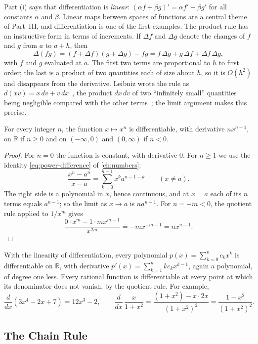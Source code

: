 Part (i) says that differentiation is \emph{linear}: $(\alpha f+\beta g)'=\alpha f'+\beta g'$ for all constants $\alpha$ and $\beta$. Linear maps between spaces of functions are a central theme of Part~III, and differentiation is one of the first examples. The product rule has an instructive form in terms of increments. If $\Delta f$ and $\Delta g$ denote the changes of $f$ and $g$ from $a$ to $a+h$, then
\[
\Delta(fg)=(f+\Delta f)(g+\Delta g)-fg=f\,\Delta g+g\,\Delta f+\Delta f\,\Delta g ,
\]
with $f$ and $g$ evaluated at $a$. The first two terms are proportional to $h$ to first order; the last is a product of two quantities each of size about $h$, so it is $O(h^2)$ and disappears from the derivative. Leibniz wrote the rule as $d(xv)=x\,dv+v\,dx$~\cite{leibniz1684}, the product $dx\,dv$ of two ``infinitely small'' quantities being negligible compared with the other terms~\cite{edwards1979}; the limit argument makes this precise.

\begin{proposition}[Powers]
\label{prop:power-rule}
For every integer $n$, the function $x\mapsto x^n$ is differentiable, with derivative $nx^{n-1}$, on $\mathbb R$ if $n\ge0$ and on $(-\infty,0)$ and $(0,\infty)$ if $n<0$.
\end{proposition}

\begin{proof}
For $n=0$ the function is constant, with derivative $0$. For $n\ge1$ we use the identity \eqref{eq:power-difference} of \cref{ch:numbers}:
\[
\frac{x^n-a^n}{x-a}=\sum_{k=0}^{n-1}x^ka^{n-1-k}\qquad(x\ne a).
\]
The right side is a polynomial in $x$, hence continuous, and at $x=a$ each of its $n$ terms equals $a^{n-1}$; so the limit as $x\to a$ is $na^{n-1}$. For $n=-m<0$, the quotient rule applied to $1/x^m$ gives
\[
\frac{0\cdot x^m-1\cdot mx^{m-1}}{x^{2m}}=-mx^{-m-1}=nx^{n-1}.
\]
\end{proof}

With the linearity of differentiation, every polynomial $p(x)=\sum_{k=0}^nc_kx^k$ is differentiable on $\mathbb R$, with derivative $p'(x)=\sum_{k=1}^nkc_kx^{k-1}$, again a polynomial, of degree one less. Every rational function is differentiable at every point at which its denominator does not vanish, by the quotient rule. For example,
\[
\frac d{dx}(3x^4-2x+7)=12x^3-2,\qquad\frac d{dx}\,\frac x{1+x^2}=\frac{(1+x^2)-x\cdot2x}{(1+x^2)^2}=\frac{1-x^2}{(1+x^2)^2}.
\]

\subsection{The Chain Rule}


